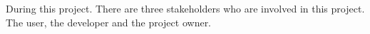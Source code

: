 During this project. There are three stakeholders who are involved in this project. The user, the developer and the project owner.
